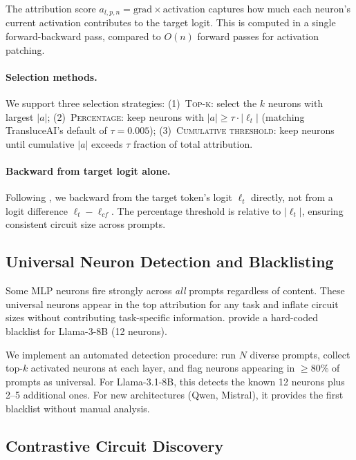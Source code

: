 \documentclass[11pt]{article}
\begin{document}
The attribution score $a_{l,p,n} = \text{grad} \times \text{activation}$ captures how much each neuron's current activation contributes to the target logit.
This is computed in a single forward-backward pass, compared to $O(n)$ forward passes for activation patching.

\paragraph{Selection methods.}
We support three selection strategies: (1)~\textsc{Top-k}: select the $k$ neurons with largest $|a|$; (2)~\textsc{Percentage}: keep neurons with $|a| \geq \tau \cdot |\ell_t|$ (matching TransluceAI's default of $\tau = 0.005$); (3)~\textsc{Cumulative threshold}: keep neurons until cumulative $|a|$ exceeds $\tau$ fraction of total attribution.

\paragraph{Backward from target logit alone.}
Following \citet{arora2025circuits}, we backward from the target token's logit $\ell_t$ directly, not from a logit difference $\ell_t - \ell_{cf}$.
The percentage threshold is relative to $|\ell_t|$, ensuring consistent circuit size across prompts.

\subsection{Universal Neuron Detection and Blacklisting}
\label{sec:blacklist}

Some MLP neurons fire strongly across \emph{all} prompts regardless of content.
These universal neurons appear in the top attribution for any task and inflate circuit sizes without contributing task-specific information.
\citet{arora2025circuits} provide a hard-coded blacklist for Llama-3-8B (12 neurons).

We implement an automated detection procedure: run $N$ diverse prompts, collect top-$k$ activated neurons at each layer, and flag neurons appearing in $\geq 80\%$ of prompts as universal.
For Llama-3.1-8B, this detects the known 12 neurons plus 2--5 additional ones.
For new architectures (Qwen, Mistral), it provides the first blacklist without manual analysis.

\subsection{Contrastive Circuit Discovery}
\label{sec:contrastive}
\end{document}

